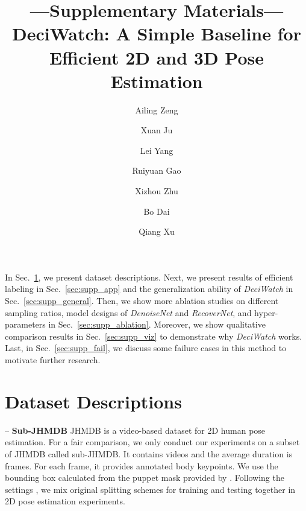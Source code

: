 \documentclass[runningheads]{llncs}
\newcommand{\name}{\emph{DeciWatch}\xspace}
\begin{document}
\pagestyle{headings}
\mainmatter
\def\ECCVSubNumber{1845}  

\title{---Supplementary Materials---\\DeciWatch: A Simple Baseline for  Efficient 2D and 3D Pose Estimation} 

\begin{comment}
\titlerunning{ECCV-22 submission ID \ECCVSubNumber} 
\authorrunning{ECCV-22 submission ID \ECCVSubNumber} 
\author{Anonymous ECCV submission}
\institute{Paper ID \ECCVSubNumber}
\end{comment}


\author{Ailing Zeng  \and
Xuan Ju  \and
Lei Yang  \and
Ruiyuan Gao  \and
Xizhou Zhu  \and
Bo Dai  \and
Qiang Xu 
}
\maketitle

In Sec.~\ref{sec:supp_exp}, we present dataset descriptions. Next, we present results of efficient labeling in Sec.~\ref{sec:supp_app} and the generalization ability of \name in Sec.~\ref{sec:supp_general}. Then, we show more ablation studies on different sampling ratios, model designs of \textit{DenoiseNet} and \textit{RecoverNet}, and hyper-parameters in Sec.~\ref{sec:supp_ablation}. Moreover, we show qualitative comparison results in Sec.~\ref{sec:supp_viz} to demonstrate why \name works. Last, in Sec.~\ref{sec:supp_fail}, we discuss some failure cases in this method to motivate further research.


\section{Dataset Descriptions}
\label{sec:supp_exp}

\noindent -- \textbf{Sub-JHMDB}  JHMDB\cite{jhuang2013towards} is a video-based dataset for 2D human pose estimation. For a fair comparison, we only conduct our experiments on a subset of JHMDB called sub-JHMDB. It contains  videos and the average duration is  frames. For each frame, it provides  annotated body keypoints. We use the bounding box calculated from the puppet mask provided by \cite{luo2018lstm}. Following the settings \cite{zhang2020key,fan2021motion}, we mix  original splitting schemes for training and testing together in 2D pose estimation experiments.
\end{document}
